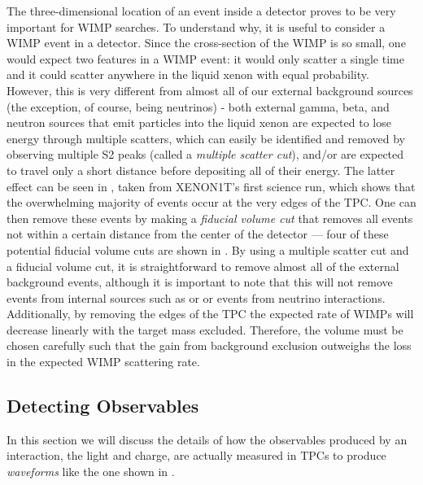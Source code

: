 The three-dimensional location of an event inside a detector proves to be very important for WIMP searches.  To understand why, it is useful to consider a WIMP event in a detector.  Since the cross-section of the WIMP is so small, one would expect two features in a WIMP event: it would only scatter a single time and it could scatter anywhere in the liquid xenon with equal probability.  However, this is very different from almost all of our external background sources (the exception, of course, being neutrinos) - both external gamma, beta, and neutron sources that emit particles into the liquid xenon are expected to lose energy through multiple scatters, which can easily be identified and removed by observing multiple S2 peaks (called a \textit{multiple scatter cut}), and/or are expected to travel only a short distance before depositing all of their energy.  The latter effect can be seen in , taken from XENON1T's first science run, which shows that the overwhelming majority of events occur at the very edges of the TPC.  One can then remove these events by making a \textit{fiducial volume cut} that removes all events not within a certain distance from the center of the detector --- four of these potential fiducial volume cuts are shown in .  By using a multiple scatter cut and a fiducial volume cut, it is straightforward to remove almost all of the external background events, although it is important to note that this will not remove events from internal sources such as  or  or events from neutrino interactions.  Additionally, by removing the edges of the TPC the expected rate of WIMPs will decrease linearly with the target mass excluded.  Therefore, the volume must be chosen carefully such that the gain from background exclusion outweighs the loss in the expected WIMP scattering rate.



\subsection{Detecting Observables}

In this section we will discuss the details of how the observables produced by an interaction, the light and charge, are actually measured in TPCs to produce \textit{waveforms} like the one shown in .

